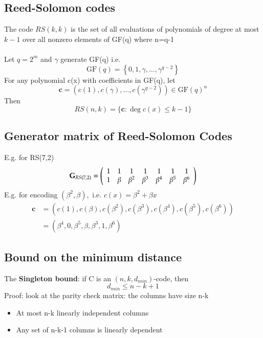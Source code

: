 \documentclass{article}[18pt]
\begin{document}
\subsection{Reed-Solomon codes}
The code $RS(k,k)$ is the set of all evaluations of polynomials of degree at most $k-1$ over all nonzero elements of GF(q) where n=q-1\\
\\
Let $q=2^m$ and $\gamma$ generate GF(q) i.e.
$$\mathrm { GF } ( q ) = \left\{ 0,1 , \gamma , \ldots , \gamma ^ { q - 2 } \right\}$$
For any polynomial c(x) with coefficients in GF(q), let
$$\mathbf { c } = \left( c ( 1 ) , c ( \gamma ) , \ldots , c \left( \gamma ^ { q - 2 } \right) \right) \in \mathrm { GF } ( q ) ^ { n }$$
Then
$$R S ( n , k ) = \{ \mathbf { c } : \operatorname { deg } c ( x ) \leq k - 1 \}$$
\subsection{Generator matrix of Reed-Solomon Codes}
E.g. for RS(7,2)
$$\mathbf { G } _ { R S ( 7,2 ) } = \left( \begin{array} { c c c c c c c } { 1 } & { 1 } & { 1 } & { 1 } & { 1 } & { 1 } & { 1 } \\ { 1 } & { \beta } & { \beta ^ { 2 } } & { \beta ^ { 3 } } & { \beta ^ { 4 } } & { \beta ^ { 5 } } & { \beta ^ { 6 } } \end{array} \right)$$
E.g. for encoding $\left( \beta ^ { 2 } , \beta \right) ,$ i.e. $c ( x ) = \beta ^ { 2 } + \beta x$
$$\begin{aligned} \mathbf { c } & = \left( c ( 1 ) , c ( \beta ) , c \left( \beta ^ { 2 } \right) , c \left( \beta ^ { 3 } \right) , c \left( \beta ^ { 4 } \right) , c \left( \beta ^ { 5 } \right) , c \left( \beta ^ { 6 } \right) \right) \\ & = \left( \beta ^ { 4 } , 0 , \beta ^ { 5 } , \beta , \beta ^ { 3 } , 1 , \beta ^ { 6 } \right) \end{aligned}$$
\subsection{Bound on the minimum distance}
The \textbf{Singleton bound}: if C is an $(n,k,d_{min})$-code, then
$$d_{min}\leqslant n-k+1$$
Proof: look at the parity check matrix: the columns have size n-k
\begin{itemize}
	\item At most n-k linearly independent columns
	\item Any set of n-k-1 columns is linearly dependent
\end{itemize}
\end{document}
